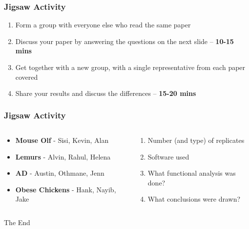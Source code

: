 \documentclass[14pt]{beamer}
\begin{document}
\begin{frame}
\frametitle{Jigsaw Activity}
\begin{enumerate}
	\item<+-> Form a group with everyone else who read the same paper
	\item<+-> Discuss your paper by answering the questions on the next slide -- \textbf{10-15 mins}
	\item<+-> Get together with a new group, with a single representative from each paper covered
	\item<+-> Share your results and discuss the differences -- \textbf{15-20 mins}
\end{enumerate}
\end{frame}

\begin{frame}
\frametitle{Jigsaw Activity}
\begin{columns}
	\begin{column}{0.4\textwidth}
		\begin{itemize}
			\item \textbf{Mouse Olf} - Sisi, Kevin, Alan
			\item \textbf{Lemurs} - Alvin, Rahul, Helena
			\item \textbf{AD} - Austin, Othmane, Jenn
			\item \textbf{Obese Chickens} - Hank, Nayib, Jake
		\end{itemize}
		\end{column}
	\begin{column}{0.6\textwidth}
		\begin{enumerate}
			\large
		\item Number (and type) of replicates
		\item Software used
		\item What functional analysis was done?
		\item What conclusions were drawn?
		\end{enumerate}
	\end{column}
\end{columns}
\end{frame}

\begin{frame}
\Huge{\centerline{The End}}
\end{frame}

\end{document}
